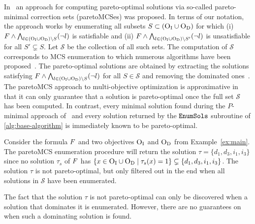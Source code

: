 In~\textcite{DBLP:conf/ijcai/Terra-NevesLM18a,DBLP:conf/aaai/Terra-NevesLM18,DBLP:conf/ijcai/Terra-NevesLM18} an approach for computing pareto-optimal solutions via so-called pareto-minimal correction sets (paretoMCSes) was proposed.
In terms of our notation, the approach works  
by enumerating all subsets $S \subset  (\textsc{O}_{\text{I}} \cup \textsc{O}_{\text{D}})$ for which (i) $F \land \bigwedge_{l \in  (\textsc{O}_{\text{I}} \cup \textsc{O}_{\text{D}}) \setminus S} (\lnot l)$ is satisfiable and 
(ii) $F \land \bigwedge_{l \in  (\textsc{O}_{\text{I}} \cup \textsc{O}_{\text{D}}) \setminus S'} (\lnot l)$ is unsatisfiable for all $S' \subsetneq S$.
Let $\mathcal{S}$ be the collection of all such sets.
The computation of $\mathcal{S}$ corresponds to MCS enumeration to which numerous algorithms have been proposed~\autocite{DBLP:conf/lpar/BendikC20,DBLP:conf/hvc/MorgadoLM12,DBLP:conf/sat/PrevitiMJM17}.
The pareto-optimal solutions are obtained by extracting the solutions satisfying $F \land \bigwedge_{l \in  (\textsc{O}_{\text{I}} \cup \textsc{O}_{\text{D}}) \setminus S} (\lnot l)$ for all $S \in \mathcal{S}$ and removing the dominated ones~\cite{DBLP:conf/ijcai/Terra-NevesLM18a}.
The paretoMCS approach to multi-objective optimization is approximative in that it can only
guarantee that a solution is pareto-optimal once the full set $\mathcal{S}$ has been computed.
In contrast, every minimal solution found during the $P$-minimal approach of~\textcite{DBLP:conf/cp/SohBTB17} and
every solution returned by the $\texttt{EnumSols}$ subroutine of \cref{alg:base-algorithm} is immediately known to be pareto-optimal.
\begin{example}\label{ex:MCS}
Consider the formula $F$ and two objectives $\textsc{O}_{\text{I}}$ and $\textsc{O}_{\text{D}}$ from Example~\ref{ex:main}. The paretoMCS enumeration procedure will return the solution 
$\tau = \{d_1, d_3, i_1, i_3\}$ since no solution $\tau_s$ of $F$ has 
$\{x \in \textsc{O}_{\text{I}} \cup \textsc{O}_{\text{D}} \mid  \tau_s(x) = 1\} \subsetneq \{d_1, d_3, i_1, i_3\}$. The solution $\tau$ is not pareto-optimal, but only filtered out in the end when all solutions in 
$\mathcal{S}$ have been enumerated.
\end{example}
The fact that the solution $\tau$ is not pareto-optimal can only be discovered when a solution that dominates it is enumerated. 
However, there are no guarantees on when such a dominating solution is found. 

